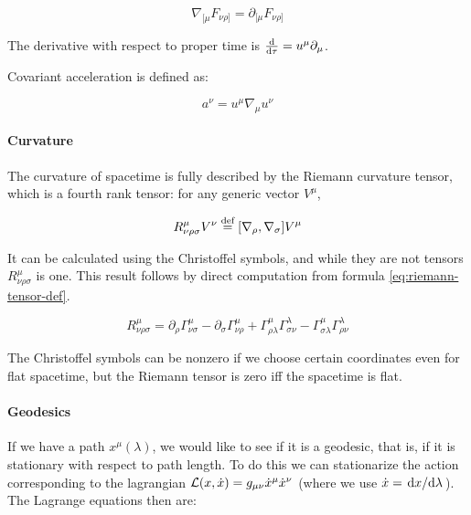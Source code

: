 \documentclass[main.tex]{subfiles}
\begin{document}
\begin{equation}
    \nabla_{[\mu} F_{\nu\rho]} = \partial_{[\mu} F_{\nu\rho]}
\end{equation}

The derivative with respect to proper time is $\dv{}{\tau} = u^\mu \partial_\mu$.

Covariant acceleration is defined as:

\begin{equation} \label{eq:covariant-acceleration-def}
    a^\nu = u^\mu \nabla_\mu u^\nu
\end{equation}

\paragraph{Curvature}

The curvature of spacetime is fully described by the Riemann curvature tensor, which is a fourth rank tensor: for any generic vector \(V^\mu\),

\begin{equation} \label{eq:riemann-tensor-def}
    R ^{\mu} _{\nu \rho \sigma} V^\nu \stackrel{\text{def}}{=} [\nabla_\rho, \nabla_\sigma]   V^\mu
\end{equation}

It can be calculated using the Christoffel symbols, and while they are not tensors \(R ^{\mu} _{\nu \rho \sigma}\) is one. This result follows by direct computation from formula \eqref{eq:riemann-tensor-def}.

\begin{equation}
    R ^{\mu} _{\nu \rho \sigma} =
     \partial_\rho \Gamma^\mu_{\nu \sigma}
    -\partial_\sigma \Gamma^\mu_{\nu \rho}
    +\Gamma^\mu_{\rho \lambda} \Gamma ^{\lambda} _{\sigma \nu}
    -\Gamma^\mu_{\sigma \lambda} \Gamma ^{\lambda} _{\rho \nu}
\end{equation}

The Christoffel symbols can be nonzero if we choose certain coordinates even for flat spacetime, but the Riemann tensor is zero iff the spacetime is flat.

\paragraph{Geodesics}

If we have a path $x^\mu(\lambda)$, we would like to see if it is a geodesic, that is, if it is stationary with respect to path length. To do this we can stationarize the action corresponding to the lagrangian $\mathcal{L} (x, \Dot{x}) = g_{\mu\nu} \Dot{x}^\mu \Dot{x}^\nu$ (where we use $\Dot{x} = \dv*{x}{\lambda}$). The Lagrange equations then are:
\end{document}
